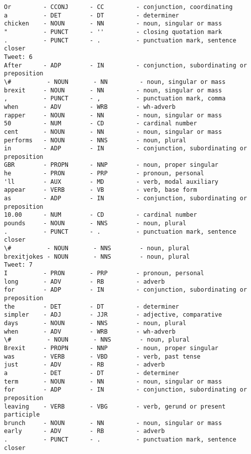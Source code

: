 \documentclass[11pt]{article}
\begin{document}
\begin{Verbatim}[commandchars=\\\{\}]
Or         - CCONJ      - CC         - conjunction, coordinating
a          - DET        - DT         - determiner
chicken    - NOUN       - NN         - noun, singular or mass
"          - PUNCT      - ''         - closing quotation mark
.          - PUNCT      - .          - punctuation mark, sentence closer
Tweet: 6
After      - ADP        - IN         - conjunction, subordinating or preposition
\#          - NOUN       - NN         - noun, singular or mass
brexit     - NOUN       - NN         - noun, singular or mass
,          - PUNCT      - ,          - punctuation mark, comma
when       - ADV        - WRB        - wh-adverb
rapper     - NOUN       - NN         - noun, singular or mass
50         - NUM        - CD         - cardinal number
cent       - NOUN       - NN         - noun, singular or mass
performs   - NOUN       - NNS        - noun, plural
in         - ADP        - IN         - conjunction, subordinating or preposition
GBR        - PROPN      - NNP        - noun, proper singular
he         - PRON       - PRP        - pronoun, personal
'll        - AUX        - MD         - verb, modal auxiliary
appear     - VERB       - VB         - verb, base form
as         - ADP        - IN         - conjunction, subordinating or preposition
10.00      - NUM        - CD         - cardinal number
pounds     - NOUN       - NNS        - noun, plural
.          - PUNCT      - .          - punctuation mark, sentence closer
\#          - NOUN       - NNS        - noun, plural
brexitjokes - NOUN       - NNS        - noun, plural
Tweet: 7
I          - PRON       - PRP        - pronoun, personal
long       - ADV        - RB         - adverb
for        - ADP        - IN         - conjunction, subordinating or preposition
the        - DET        - DT         - determiner
simpler    - ADJ        - JJR        - adjective, comparative
days       - NOUN       - NNS        - noun, plural
when       - ADV        - WRB        - wh-adverb
\#          - NOUN       - NNS        - noun, plural
Brexit     - PROPN      - NNP        - noun, proper singular
was        - VERB       - VBD        - verb, past tense
just       - ADV        - RB         - adverb
a          - DET        - DT         - determiner
term       - NOUN       - NN         - noun, singular or mass
for        - ADP        - IN         - conjunction, subordinating or preposition
leaving    - VERB       - VBG        - verb, gerund or present participle
brunch     - NOUN       - NN         - noun, singular or mass
early      - ADV        - RB         - adverb
.          - PUNCT      - .          - punctuation mark, sentence closer

\end{Verbatim}
\end{document}
